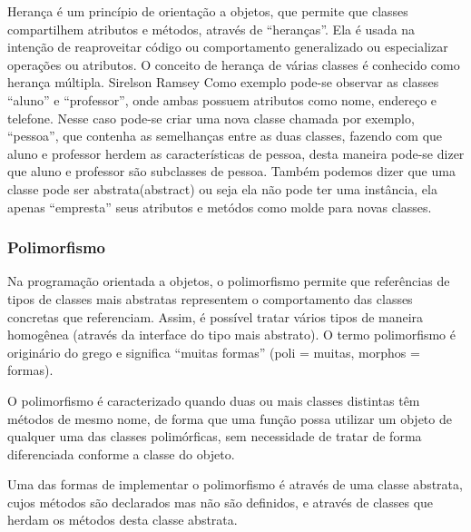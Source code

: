 Herança é um princípio de orientação a objetos, que permite que classes compartilhem atributos e métodos, através de ``heranças''. Ela é usada na intenção de reaproveitar código ou comportamento generalizado ou especializar operações ou atributos. O conceito de herança de várias classes é conhecido como herança múltipla. Sirelson Ramsey Como exemplo pode-se observar as classes ``aluno'' e ``professor'', onde ambas possuem atributos como nome, endereço e telefone. Nesse caso pode-se criar uma nova classe chamada por exemplo, ``pessoa'', que contenha as semelhanças entre as duas classes, fazendo com que aluno e professor herdem as características de pessoa, desta maneira pode-se dizer que aluno e professor são subclasses de pessoa. Também podemos dizer que uma classe pode ser abstrata(abstract) ou seja ela não pode ter uma instância, ela apenas ``empresta'' seus atributos e metódos como molde para novas classes.

\subsubsection{Polimorfismo}

Na programação orientada a objetos, o polimorfismo permite que referências de tipos de classes mais abstratas representem o comportamento das classes concretas que referenciam. Assim, é possível tratar vários tipos de maneira homogênea (através da interface do tipo mais abstrato). O termo polimorfismo é originário do grego e significa ``muitas formas'' (poli = muitas, morphos = formas).

O polimorfismo é caracterizado quando duas ou mais classes distintas têm métodos de mesmo nome, de forma que uma função possa utilizar um objeto de qualquer uma das classes polimórficas, sem necessidade de tratar de forma diferenciada conforme a classe do objeto.

Uma das formas de implementar o polimorfismo é através de uma classe abstrata, cujos métodos são declarados mas não são definidos, e através de classes que herdam os métodos desta classe abstrata.
